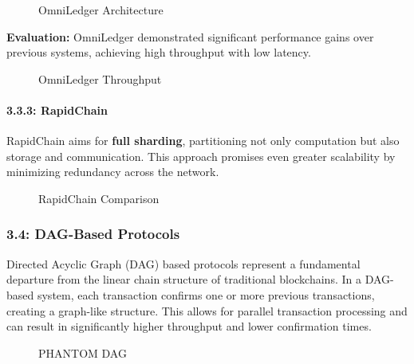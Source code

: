 \begin{figure}
\centering
\caption{OmniLedger Architecture}
\end{figure}

\textbf{Evaluation:} OmniLedger demonstrated significant performance
gains over previous systems, achieving high throughput with low latency.

\begin{figure}
\centering
\caption{OmniLedger Throughput}
\end{figure}

\paragraph{3.3.3: RapidChain}\label{rapidchain}

RapidChain aims for \textbf{full sharding}, partitioning not only
computation but also storage and communication. This approach promises
even greater scalability by minimizing redundancy across the network.

\begin{figure}
\centering
\caption{RapidChain Comparison}
\end{figure}

\subsubsection{3.4: DAG-Based Protocols}\label{dag-based-protocols}

Directed Acyclic Graph (DAG) based protocols represent a fundamental
departure from the linear chain structure of traditional blockchains. In
a DAG-based system, each transaction confirms one or more previous
transactions, creating a graph-like structure. This allows for parallel
transaction processing and can result in significantly higher throughput
and lower confirmation times.

\begin{figure}
\centering
\caption{PHANTOM DAG}
\end{figure}

